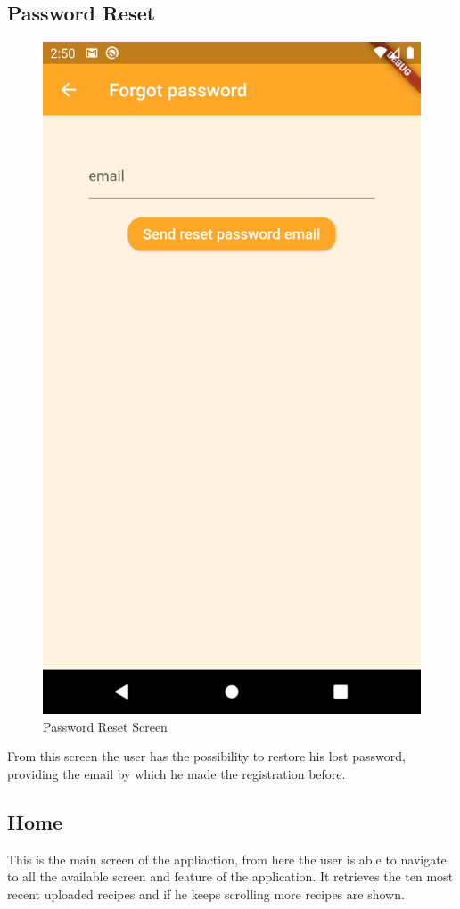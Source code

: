 \subsection{Password Reset}
\begin{figure}[H]
	\centering
	\includegraphics[width = .3\linewidth]{img/PasswordReset.png}
	\caption{Password Reset Screen}
\end{figure}
From this screen the user has the possibility to restore his lost password, providing the email by which he made the registration before.
\subsection{Home}
This is the main screen of the appliaction, from here the user is able to navigate to all the available screen and feature of the application. It retrieves the ten most recent uploaded recipes and if he keeps scrolling more recipes are shown.
